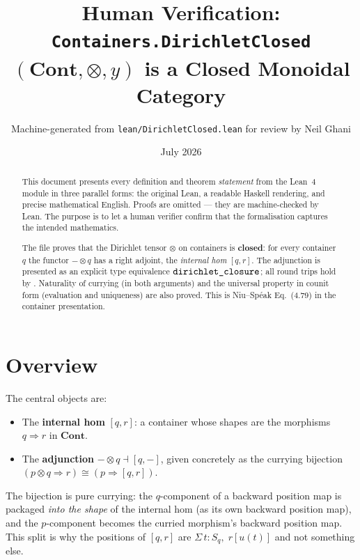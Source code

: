 \documentclass[11pt,a4paper]{article}
\title{Human Verification: \texttt{Containers.DirichletClosed}\\[4pt]
  \large $(\mathbf{Cont}, \otimes, y)$ is a Closed Monoidal Category}
\author{Machine-generated from \texttt{lean/DirichletClosed.lean} for review by Neil Ghani}
\date{July 2026}
\begin{document}
\maketitle

\begin{abstract}
This document presents every definition and theorem \emph{statement} from the
Lean~4 module  in three parallel forms: the
original Lean, a readable Haskell rendering, and precise mathematical English.
Proofs are omitted --- they are machine-checked by Lean.  The purpose is to let
a human verifier confirm that the formalisation captures the intended
mathematics.

The file proves that the Dirichlet tensor $\otimes$ on containers is
\textbf{closed}: for every container $q$ the functor $- \otimes q$ has a right
adjoint, the \emph{internal hom} $[q, r]$.  The adjunction is presented as an
explicit type equivalence $\texttt{dirichlet\_closure}$; all round trips hold by
.  Naturality of currying (in both arguments) and the universal
property in counit form (evaluation and uniqueness) are also proved.  This is
Niu--Sp\'{e}ak Eq.~(4.79) in the container presentation.
\end{abstract}

\tableofcontents
\bigskip

\section{Overview}

The central objects are:
\begin{itemize}
  \item The \textbf{internal hom} $[q, r]$: a container whose shapes are the
    morphisms $q \Rightarrow r$ in $\mathbf{Cont}$.
  \item The \textbf{adjunction} $- \otimes q \dashv [q, -]$, given concretely
    as the currying bijection
    $(p \otimes q \Rightarrow r) \cong (p \Rightarrow [q, r])$.
\end{itemize}

The bijection is pure currying: the $q$-component of a backward position map
is packaged \emph{into the shape} of the internal hom (as its own backward
position map), and the $p$-component becomes the curried morphism's backward
position map.  This split is why the positions of $[q, r]$ are
$\Sigma\,t : S_q,\; r[u(t)]$ and not something else.
\end{document}
